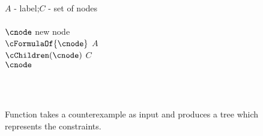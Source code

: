 \begin{figure}[t]
\begin{minipage}[t]{.94\columnwidth}
    \algFunction \algFreshCnode\\
    \algInput $A$ - label;\tabTTT $C$ - set of nodes \\
    \algBegin \\
    \tabT $\cnode$ \algAssgn new node\\
    \tabT $\cFormulaOf{\cnode}$ \algAssgn $A$ \\
    \tabT $\cChildren(\cnode)$ \algAssgn $C$\\
    \tabT \algReturn $\cnode$ \\
    \algEnd \\
     
  \end{minipage}
  \vspace{1ex}
    \mbox{}\\
  \linespread{1}
  \caption{
    Function \algMkCexTree takes a counterexample as input and 
    produces a tree which represents the constraints.
  }
  \label{fig-alg-cex-tree}
\end{figure}


